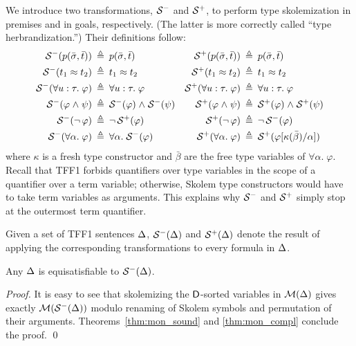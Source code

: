 We introduce two transformations, $\mathcal{S}^-$ and $\mathcal{S}^+$, to perform type
skolemization in premises and in goals, respectively. (The latter is more
correctly called ``type herbrandization.'')
Their definitions follow:
\begin{align*}
\mathcal{S}^-(p(\bar{\sigma},\bar{t})) &\:\triangleq\: p(\bar{\sigma},\bar{t}) &
\mathcal{S}^+(p(\bar{\sigma},\bar{t})) &\:\triangleq\: p(\bar{\sigma},\bar{t}) \\
\mathcal{S}^-(t_1 \approx t_2) &\:\triangleq\: t_1 \approx t_2 &
\mathcal{S}^+(t_1 \approx t_2) &\:\triangleq\: t_1 \approx t_2 \\
\mathcal{S}^-(\forall u \mathrel{:} \tau .\; \varphi) &\:\triangleq\: \forall u \mathrel{:} \tau .\; \varphi &
\mathcal{S}^+(\forall u \mathrel{:} \tau .\; \varphi) &\:\triangleq\: \forall u \mathrel{:} \tau .\; \varphi \\
\mathcal{S}^-(\varphi \mathrel{\land} \psi) &\:\triangleq\: \mathcal{S}^-(\varphi) \mathrel{\land} \mathcal{S}^-(\psi) &
\mathcal{S}^+(\varphi \mathrel{\land} \psi) &\:\triangleq\: \mathcal{S}^+(\varphi) \mathrel{\land} \mathcal{S}^+(\psi) \\
\mathcal{S}^-(\lnot\, \varphi) &\:\triangleq\: \lnot\, \mathcal{S}^+(\varphi) &
\mathcal{S}^+(\lnot\, \varphi) &\:\triangleq\: \lnot\, \mathcal{S}^-(\varphi) \\
\mathcal{S}^-(\forall \alpha .\; \varphi) &\:\triangleq\: \forall \alpha .\; \mathcal{S}^-(\varphi) &
\mathcal{S}^+(\forall \alpha .\; \varphi) &\:\triangleq\:
\mathcal{S}^+(\varphi[\kappa(\bar\beta)/\alpha])
\end{align*}
where $\kappa$ is a fresh type constructor and $\bar\beta$ are
the free type variables of $\forall \alpha .\; \varphi$.
Recall that TFF1 forbids quantifiers over type variables in the scope
of a quantifier over a term variable; otherwise, Skolem type constructors
would have to take term variables as arguments. This explains why $\mathcal{S}^-$ and
$\mathcal{S}^+$ simply stop at the outermost term quantifier.

Given a set of TFF1 sentences $\mathrm{\Delta}$,
$\mathcal{S}^-(\mathrm{\Delta})$ and $\mathcal{S}^+(\mathrm{\Delta})$ denote the result of applying
the corresponding transformations to every formula in $\mathrm{\Delta}$.

\begin{theorem} \label{thm:sko}
Any $\mathrm{\Delta}$ is equisatisfiable to $\mathcal{S}^-(\mathrm{\Delta})$.
\end{theorem}
\begin{proof}
It is easy to see that
skolemizing the $\mathsf{D}$-sorted variables in $\mathcal{M}(\mathrm{\Delta})$ gives
exactly $\mathcal{M}(\mathcal{S}^-(\mathrm{\Delta}))$ modulo renaming of Skolem symbols and
permutation of their arguments. Theorems~\ref{thm:mon_sound} and
\ref{thm:mon_compl} conclude the proof.
\qed
\end{proof}

%
